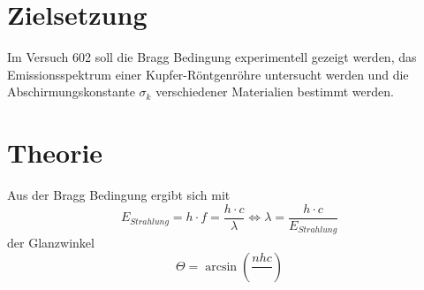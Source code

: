 \section{Zielsetzung}
\label{sec:Zielsetzung}

Im Versuch 602 soll die Bragg Bedingung experimentell gezeigt werden, das Emissionsspektrum einer Kupfer-Röntgenröhre untersucht werden
und die Abschirmungskonstante $σ_k$ verschiedener Materialien bestimmt werden.

\section{Theorie}
\label{sec:Theorie}


Aus der Bragg Bedingung ergibt sich mit 
\begin{equation}
    E_{Strahlung} = h \cdot f = \frac{h \cdot c}{\lambda} \Leftrightarrow \lambda = \frac{h \cdot c}{E_{Strahlung}}
\end{equation}
der Glanzwinkel 
\begin{equation}
    \Theta = \arcsin(\frac{n h c}{})
\end{equation}